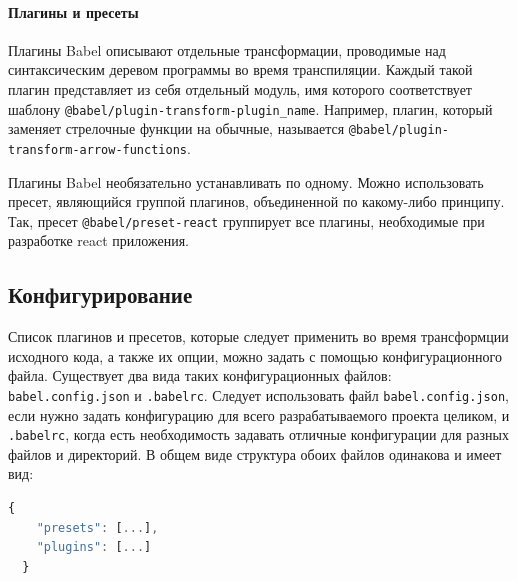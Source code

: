 \documentclass[14pt, a4paper]{article}
\def\code#1{\texttt{#1}} %
\begin{document}
\paragraph{Плагины и пресеты} \mbox{}

Плагины Babel описывают отдельные трансформации, проводимые над синтаксическим деревом программы во 
время транспиляции. Каждый такой плагин представляет из себя отдельный модуль, имя которого 
соответствует шаблону \code{@babel/plugin-transform-plugin\_name}. Например, плагин, который заменяет 
стрелочные функции на обычные, называется \linebreak \code{@babel/plugin-transform-arrow-functions}.

Плагины Babel необязательно устанавливать по одному. Можно использовать пресет, являющийся группой 
плагинов, объединенной по какому-либо принципу. Так, пресет \code{@babel/preset-react} группирует 
все плагины, необходимые при разработке react приложения.

\subsection{Конфигурирование}
Список плагинов и пресетов, которые следует применить во время трансформции исходного кода, а также 
их опции, можно задать с помощью конфигурационного файла. Существует два вида таких конфигурационных
файлов: \code{babel.config.json} и \code{.babelrc}. Следует использовать файл \code{babel.config.json}, 
если нужно задать конфигурацию для всего разрабатываемого проекта целиком, и \code{.babelrc}, когда 
есть необходимость задавать отличные конфигурации для разных файлов и директорий. В общем виде 
структура обоих файлов одинакова и имеет вид:

\begin{lstlisting}[language=JavaScript]
  {
    "presets": [...],
    "plugins": [...]
  }
\end{lstlisting}

\end{document}
